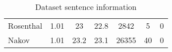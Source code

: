 \documentclass[../../fyp.tex]{subfiles}
\begin{document}
\begin{table}
\begin{tabular}{|l|c|cc|ccc|}
		Rosenthal                         & 1.01                                                     & 23                                                           & 22.8                                                         & 2842       & 5          & 0           \\
		Nakov                             & 1.01                                                     & 23.2                                                         & 23.1                                                         & 26355      & 40         & 0           \\ \hline
	\end{tabular}
	\caption{Dataset sentence information}
	\label{tab:dataset_sentence_info}
\end{table}
\end{document}
